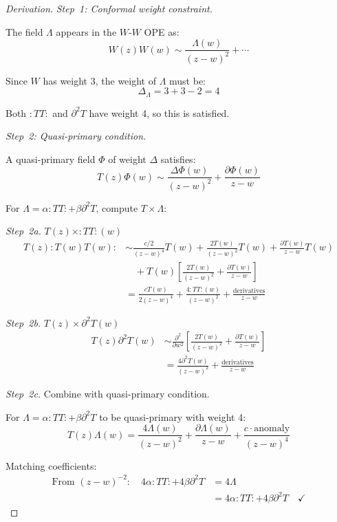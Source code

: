 \begin{proof}[Derivation]

\emph{Step~1: Conformal weight constraint.}

The field $\Lambda$ appears in the $W$-$W$ OPE as:
\[W(z)W(w) \sim \frac{\Lambda(w)}{(z-w)^2} + \cdots\]

Since $W$ has weight 3, the weight of $\Lambda$ must be:
\[\Delta_\Lambda = 3 + 3 - 2 = 4\]

Both $:TT:$ and $\partial^2 T$ have weight 4, so this is satisfied.

\emph{Step~2: Quasi-primary condition.}

A quasi-primary field $\Phi$ of weight $\Delta$ satisfies:
\[T(z)\Phi(w) \sim \frac{\Delta \Phi(w)}{(z-w)^2} + \frac{\partial\Phi(w)}{z-w}\]

For $\Lambda = \alpha :TT: + \beta \partial^2 T$, compute $T \times \Lambda$:

\emph{Step~2a.} $T(z) \times :TT:(w)$
\begin{align}
T(z) :T(w)T(w): &\sim \frac{c/2}{(z-w)^4} T(w) + \frac{2T(w)}{(z-w)^2} T(w) 
+ \frac{\partial T(w)}{z-w} T(w) \\
&\quad + T(w) \left[\frac{2T(w)}{(z-w)^2} + \frac{\partial T(w)}{z-w}\right] \\
&= \frac{c T(w)}{2(z-w)^4} + \frac{4 :TT:(w)}{(z-w)^2} 
+ \frac{\text{derivatives}}{z-w}
\end{align}

\emph{Step~2b.} $T(z) \times \partial^2 T(w)$
\begin{align}
T(z) \partial^2 T(w) &\sim \frac{\partial^2}{\partial w^2}\left[\frac{2T(w)}{(z-w)^2} 
+ \frac{\partial T(w)}{z-w}\right] \\
&= \frac{4\partial^2 T(w)}{(z-w)^2} + \frac{\text{derivatives}}{z-w}
\end{align}

\emph{Step~2c.} Combine with quasi-primary condition.

For $\Lambda = \alpha :TT: + \beta \partial^2 T$ to be quasi-primary with weight 4:
\[T(z)\Lambda(w) = \frac{4\Lambda(w)}{(z-w)^2} + \frac{\partial\Lambda(w)}{z-w} 
+ \frac{c \cdot \text{anomaly}}{(z-w)^4}\]

Matching coefficients:
\begin{align}
\text{From } (z-w)^{-2}: \quad 4\alpha :TT: + 4\beta \partial^2 T &= 4\Lambda \\
&= 4\alpha :TT: + 4\beta \partial^2 T \quad \checkmark
\end{align}


\end{proof}
